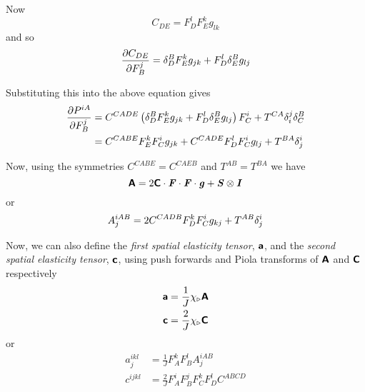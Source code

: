 Now
\begin{equation}
  C_{DE}=F^{l}_{D}F^{k}_{E}g_{lk}
\end{equation}
and so
\begin{equation}
   \dfrac{\partial C_{DE}}{\partial F^{j}_{B}} =  \delta ^{B}_{D} F^{k}_{E}g_{jk}+F^{l}_{D}  \delta ^{B}_{E} g_{lj}
\end{equation}

Substituting this into the above equation gives
\begin{equation}
  \begin{split}
     \dfrac{\partial P^{iA}}{\partial F^{j}_{B}} &=C^{CADE}\left(   \delta ^{B}_{D} F^{k}_{E}g_{jk}+
      F^{l}_{D}  \delta ^{B}_{E} g_{lj} \right)F^{i}_{C}+T^{CA}  \delta ^{j}_{i}   \delta ^{B}_{C} \\
    &=C^{CABE}F^{k}_{E}F^{i}_{C}g_{jk}+C^{CADE}F^{l}_{D}F^{i}_{C}g_{lj}+T^{BA}  \delta ^{i}_{j} 
  \end{split}
\end{equation}

Now, using the symmetries $C^{CABE}=C^{CAEB}$ and $T^{AB}=T^{BA}$ we have
\begin{equation}
  \boldsymbol{\mathsf{A}}=2 \boldsymbol{\mathsf{C}}  \cdot   \boldsymbol{\mathit{F}}  \cdot   \boldsymbol{\mathit{F}}  \cdot  \boldsymbol{\mathit{g}}   +
   \boldsymbol{\mathit{S}} \otimes \boldsymbol{\mathit{I}} 
\end{equation}
or
\begin{equation}
  A^{iAB}_{j}=2C^{CADB}F^{k}_{D}F^{i}_{C}g_{kj}+T^{AB}  \delta ^{i}_{j} 
\end{equation}

Now, we can also define the \emph{first spatial elasticity tensor},
$\boldsymbol{\mathsf{a}}$, and the \emph{second spatial elasticity tensor},
$\boldsymbol{\mathsf{c}}$, using push forwards and Piola transforms of $\boldsymbol{\mathsf{A}}$
and $\boldsymbol{\mathsf{C}}$ respectively \ie
\begin{equation}
  \begin{split}
    \boldsymbol{\mathsf{a}}&=\frac{1}{J} \chi_{\triangleright}\boldsymbol{\mathsf{A}} \\
    \boldsymbol{\mathsf{c}}&=\frac{2}{J} \chi_{\triangleright}\boldsymbol{\mathsf{C}} \\
  \end{split}
\end{equation}
or
\begin{equation}
  \begin{split}
    a^{ikl}_{j}&=\frac{1}{J}F^{k}_{A}F^{l}_{B}A^{iAB}_{j} \\
    c^{ijkl}&=\frac{2}{J}F^{i}_{A}F^{j}_{B}F^{k}_{C}F^{l}_{D}C^{ABCD} \\
  \end{split}
\end{equation}

